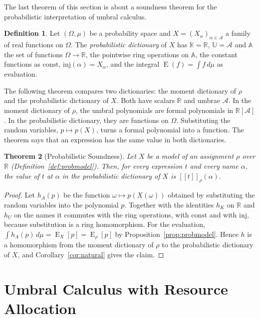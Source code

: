 \documentclass[11pt,a4paper]{report}
\theoremstyle{plain}
\newtheorem{theorem}{Theorem}[chapter]
\theoremstyle{definition}
\newtheorem{definition}[theorem]{Definition}
\theoremstyle{remark}
\newcommand{\E}{\operatorname{E}}
\newcommand{\sK}{\mathbb{K}}
\newcommand{\sU}{\mathbb{U}}
\newcommand{\sA}{\mathbb{A}}
\newcommand{\RR}{\mathbb{R}}
\newcommand{\den}[2]{[\![#1]\!]_{#2}}
\begin{document}
The last theorem of this section is about a soundness theorem for the probabilistic
interpretation of umbral calculus.

\begin{definition}
\label{def:probdict}
Let $(\Omega, \mu)$ be a probability space and $X = (X_\alpha)_{\alpha \in
\mathcal{A}}$ a family of real functions on $\Omega$. The \emph{probabilistic
dictionary} of $X$ has $\sK = \RR$, $\sU = \mathcal{A}$ and $\sA$ the set of functions
$\Omega \to \RR$, the pointwise ring operations on $\sA$, the constant functions as
$\mathrm{const}$, $\mathrm{inj}(\alpha) = X_\alpha$, and the integral
$\E(f) = \int f\, d\mu$ as evaluation.
\end{definition}

The following theorem compares two dictionaries: the moment dictionary
of $\rho$ and the probabilistic dictionary of $X$. Both have scalars
$\RR$ and umbrae $\mathcal{A}$. In the moment dictionary of $\rho$, the umbral
polynomials are formal polynomials in $\RR[\mathcal{A}]$. In the probabilistic
dictionary, they are functions on $\Omega$. Substituting the random variables,
$p \mapsto p(X)$, turns a formal polynomial into a function. The theorem says
that an expression has the same value in both dictionaries.

\begin{theorem}[Probabilistic Soundness]
\label{thm:probabilistic}
Let $X$ be a model of an assignment $\rho$ over $\RR$
(Definition~\ref{def:probmodel}). Then, for every expression
$t$ and every name $\alpha$, the value of $t$ at $\alpha$ in the probabilistic
dictionary of $X$ is $\den{t}{\rho}(\alpha)$.
\end{theorem}

\begin{proof}
Let $h_A(p)$ be the function $\omega \mapsto p(X(\omega))$ obtained by
substituting the random variables into the polynomial $p$. Together with the
identities $h_K$ on $\RR$ and $h_U$ on the names it commutes with the ring
operations, with $\mathrm{const}$ and with $\mathrm{inj}$, because substitution
is a ring homomorphism. For the evaluation, $\int h_A(p)\, d\mu = \E_X[p] =
\E_\rho[p]$ by Proposition~\ref{prop:probmodel}. Hence
$h$ is a homomorphism from the moment dictionary of $\rho$ to the probabilistic
dictionary of $X$, and Corollary~\ref{cor:natural} gives the claim.
\end{proof}


\chapter{Umbral Calculus with Resource Allocation}
\label{ch:full}
\end{document}
